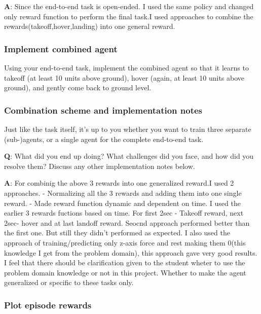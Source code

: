 \documentclass[11pt]{article}
\begin{document}
\textbf{A}: Since the end-to-end task is open-ended. I used the same
policy and changed only reward function to perform the final task.I used
approaches to combine the rewards(takeoff,hover,landing) into one
general reward.

\hypertarget{implement-combined-agent}{%
\subsubsection{Implement combined
agent}\label{implement-combined-agent}}

Using your end-to-end task, implement the combined agent so that it
learns to takeoff (at least 10 units above ground), hover (again, at
least 10 units above ground), and gently come back to ground level.

\hypertarget{combination-scheme-and-implementation-notes}{%
\subsubsection{Combination scheme and implementation
notes}\label{combination-scheme-and-implementation-notes}}

Just like the task itself, it's up to you whether you want to train
three separate (sub-)agents, or a single agent for the complete
end-to-end task.

\textbf{Q}: What did you end up doing? What challenges did you face, and
how did you resolve them? Discuss any other implementation notes below.

\textbf{A}: For combinig the above 3 rewards into one generalized
reward.I used 2 approaches. - Normalizing all the 3 rewards and adding
them into one single reward. - Made reward function dynamic and
dependent on time. I used the earlier 3 rewards fuctions based on time.
For first 2sec - Takeoff reward, next 2sec- hover and at last landoff
reward. Seocnd approach performed better than the first one. But still
they didn't performed as expected. I also used the approach of
training/predicting only z-axis force and rest making them 0(this
knowledge I get from the problem domain), this approach gave very good
results. I feel that there should be clarification given to the student
wheter to use the problem domain knowledge or not in this project.
Whether to make the agent generalized or specific to these tasks only.

\hypertarget{plot-episode-rewards}{%
\subsubsection{Plot episode rewards}\label{plot-episode-rewards}}
\end{document}
